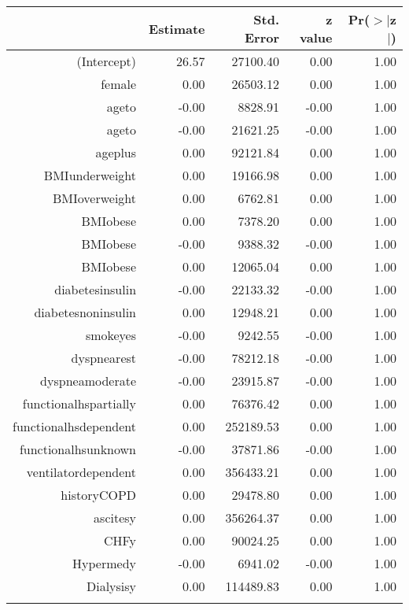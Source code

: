 
\bigskip\bigskip
\centering
\begin{tabular}{rrrrr}
  \hline
 & Estimate & Std. Error & z value & Pr($>$$|$z$|$) \\ 
  \hline
(Intercept) & 26.57 & 27100.40 & 0.00 & 1.00 \\ 
  female & 0.00 & 26503.12 & 0.00 & 1.00 \\ 
  age\-65\-to\-74 & -0.00 & 8828.91 & -0.00 & 1.00 \\ 
  age\-75\-to\-84 & -0.00 & 21621.25 & -0.00 & 1.00 \\ 
  age\-85\-plus & 0.00 & 92121.84 & 0.00 & 1.00 \\ 
  BMI\-underweight & 0.00 & 19166.98 & 0.00 & 1.00 \\ 
  BMI\-overweight & 0.00 & 6762.81 & 0.00 & 1.00 \\ 
  BMI\-obese\-1 & 0.00 & 7378.20 & 0.00 & 1.00 \\ 
  BMI\-obese\-2 & -0.00 & 9388.32 & -0.00 & 1.00 \\ 
  BMI\-obese\-3 & 0.00 & 12065.04 & 0.00 & 1.00 \\ 
  diabetes\-insulin & -0.00 & 22133.32 & -0.00 & 1.00 \\ 
  diabetes\-noninsulin & 0.00 & 12948.21 & 0.00 & 1.00 \\ 
  smoke\-yes & -0.00 & 9242.55 & -0.00 & 1.00 \\ 
  dyspnea\-rest & -0.00 & 78212.18 & -0.00 & 1.00 \\ 
  dyspnea\-moderate & -0.00 & 23915.87 & -0.00 & 1.00 \\ 
  functional\-hs\-partially & 0.00 & 76376.42 & 0.00 & 1.00 \\ 
  functional\-hs\-dependent & 0.00 & 252189.53 & 0.00 & 1.00 \\ 
  functional\-hs\-unknown & -0.00 & 37871.86 & -0.00 & 1.00 \\ 
  ventilator\-dependent & 0.00 & 356433.21 & 0.00 & 1.00 \\ 
  history\-COPD & 0.00 & 29478.80 & 0.00 & 1.00 \\ 
  ascites\-y & 0.00 & 356264.37 & 0.00 & 1.00 \\ 
  CHF\-y & 0.00 & 90024.25 & 0.00 & 1.00 \\ 
  Hyper\-med\-y & -0.00 & 6941.02 & -0.00 & 1.00 \\ 
  Dialysis\-y & 0.00 & 114489.83 & 0.00 & 1.00 \\ 
$$
\end{tabular}
